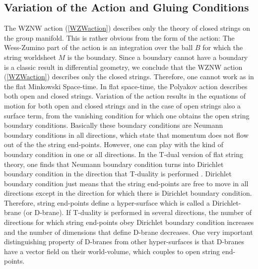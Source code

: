 \documentclass[a4paper,12pt]{article}
\begin{document}
\subsection{Variation of the Action and Gluing Conditions}

The WZNW action (\ref{WZWaction}) describes only the theory of closed
strings on the group manifold. This is rather obvious from the form of the
action: The Wess-Zumino part of the action is an integration over the ball $%
B $ for which the string worldsheet $M$ is the boundary. Since a boundary
cannot have a boundary is a classic result in differential geometry, we
conclude that the WZNW action (\ref{WZWaction}) describes only the closed
strings. Therefore, one cannot work as in the flat Minkowski Space-time. In
flat space-time, the Polyakov action describes both open and closed strings.
Variation of the action results in the equations of motion for both open and
closed strings and in the case of open strings also a surface term, from the
vanishing condition for which one obtains the open string boundary
conditions. Basically these boundary conditions are Neumann boundary
conditions in all directions, which state that momentum does not flow out of
the the string end-points. However, one can play with the kind of boundary
condition in one or all directions. In the T-dual version of flat string
theory, one finds that Neumann boundary condition turns into Dirichlet
boundary condition in the direction that T-duality is performed \cite{TASI}.
Dirichlet boundary condition just means that the string end-points are free
to move in all directions except in the direction for which there is
Dirichlet boundary condition. Therefore, string end-points define a
hyper-surface which is called a Dirichlet-brane (or D-brane). If T-duality
is performed in several directions, the number of directions for which
string end-points obey Dirichlet boundary condition increases and the number
of dimensions that define D-brane decreases. One very important
distinguishing property of D-branes from other hyper-surfaces is that
D-branes have a vector field on their world-volume, which couples to open
string end-points.
\end{document}

